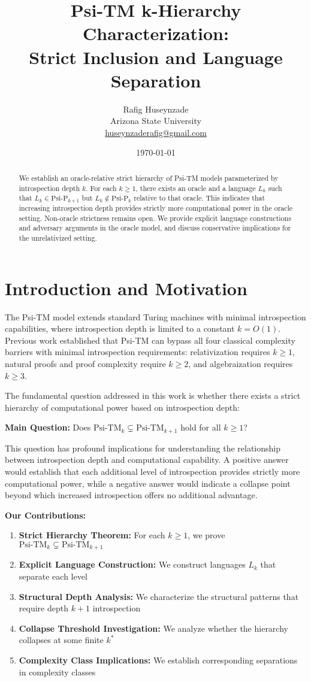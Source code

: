 \documentclass[11pt]{article}
\title{Psi-TM k-Hierarchy Characterization:\\
\large{Strict Inclusion and Language Separation}}
\author{Rafig Huseynzade\\
Arizona State University\\
\href{mailto:huseynzaderafig@gmail.com}{huseynzaderafig@gmail.com}}
\date{\today}
\begin{document}
\maketitle

\begin{abstract}
We establish an oracle-relative strict hierarchy of Psi-TM models parameterized by introspection depth $k$. For each $k \geq 1$, there exists an oracle and a language $L_k$ such that $L_k \in \text{Psi-P}_{k+1}$ but $L_k \notin \text{Psi-P}_k$ relative to that oracle. This indicates that increasing introspection depth provides strictly more computational power in the oracle setting. Non-oracle strictness remains open. We provide explicit language constructions and adversary arguments in the oracle model, and discuss conservative implications for the unrelativized setting.
\end{abstract}

\section{Introduction and Motivation}

The Psi-TM model extends standard Turing machines with minimal introspection capabilities, where introspection depth is limited to a constant $k = O(1)$. Previous work established that Psi-TM can bypass all four classical complexity barriers with minimal introspection requirements: relativization requires $k \geq 1$, natural proofs and proof complexity require $k \geq 2$, and algebraization requires $k \geq 3$.

The fundamental question addressed in this work is whether there exists a strict hierarchy of computational power based on introspection depth:

\textbf{Main Question:} Does $\text{Psi-TM}_k \subsetneq \text{Psi-TM}_{k+1}$ hold for all $k \geq 1$?

This question has profound implications for understanding the relationship between introspection depth and computational capability. A positive answer would establish that each additional level of introspection provides strictly more computational power, while a negative answer would indicate a collapse point beyond which increased introspection offers no additional advantage.

\textbf{Our Contributions:}
\begin{enumerate}
\item \textbf{Strict Hierarchy Theorem:} For each $k \geq 1$, we prove $\text{Psi-TM}_k \subsetneq \text{Psi-TM}_{k+1}$
\item \textbf{Explicit Language Construction:} We construct languages $L_k$ that separate each level
\item \textbf{Structural Depth Analysis:} We characterize the structural patterns that require depth $k+1$ introspection
\item \textbf{Collapse Threshold Investigation:} We analyze whether the hierarchy collapses at some finite $k^*$
\item \textbf{Complexity Class Implications:} We establish corresponding separations in complexity classes
\end{enumerate}
\end{document}
